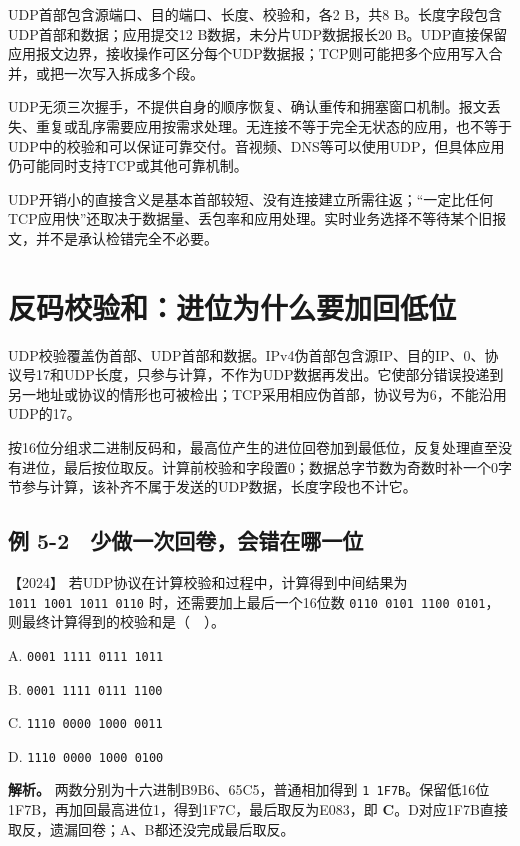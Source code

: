 UDP首部包含源端口、目的端口、长度、校验和，各2 B，共8 B。长度字段包含UDP首部和数据；应用提交12 B数据，未分片UDP数据报长20 B。UDP直接保留应用报文边界，接收操作可区分每个UDP数据报；TCP则可能把多个应用写入合并，或把一次写入拆成多个段。

UDP无须三次握手，不提供自身的顺序恢复、确认重传和拥塞窗口机制。报文丢失、重复或乱序需要应用按需求处理。无连接不等于完全无状态的应用，也不等于UDP中的校验和可以保证可靠交付。音视频、DNS等可以使用UDP，但具体应用仍可能同时支持TCP或其他可靠机制。

UDP开销小的直接含义是基本首部较短、没有连接建立所需往返；``一定比任何TCP应用快''还取决于数据量、丢包率和应用处理。实时业务选择不等待某个旧报文，并不是承认检错完全不必要。

\section{反码校验和：进位为什么要加回低位}\label{cn-05-03}

UDP校验覆盖伪首部、UDP首部和数据。IPv4伪首部包含源IP、目的IP、0、协议号17和UDP长度，只参与计算，不作为UDP数据再发出。它使部分错误投递到另一地址或协议的情形也可被检出；TCP采用相应伪首部，协议号为6，不能沿用UDP的17。

按16位分组求二进制反码和，最高位产生的进位回卷加到最低位，反复处理直至没有进位，最后按位取反。计算前校验和字段置0；数据总字节数为奇数时补一个0字节参与计算，该补齐不属于发送的UDP数据，长度字段也不计它。

\subsection{例 5-2　少做一次回卷，会错在哪一位}\label{cn-ex5-2}

\noindent{}【2024】 若UDP协议在计算校验和过程中，计算得到中间结果为 \allowbreak{}\texttt{1011\ 1001\ 1011\ 0110} 时，还需要加上最后一个16位数 \allowbreak{}\texttt{0110\ 0101\ 1100\ 0101}，则最终计算得到的校验和是（　）。

A. \allowbreak{}\texttt{0001\ 1111\ 0111\ 1011}

B. \allowbreak{}\texttt{0001\ 1111\ 0111\ 1100}

C. \allowbreak{}\texttt{1110\ 0000\ 1000\ 0011}

D. \allowbreak{}\texttt{1110\ 0000\ 1000\ 0100}


\textbf{解析。} 两数分别为十六进制B9B6、65C5，普通相加得到 \allowbreak{}\texttt{1\ 1F7B}。保留低16位1F7B，再加回最高进位1，得到1F7C，最后取反为E083，即 \textbf{C}。D对应1F7B直接取反，遗漏回卷；A、B都还没完成最后取反。

